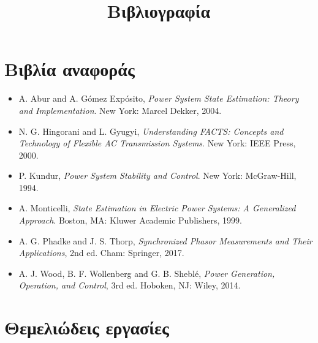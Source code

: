 \title{Βιβλιογραφία}

\section{Βιβλία αναφοράς}

\begin{itemize}
\item A. Abur and A. Gómez Expósito, \textit{Power System State Estimation: Theory and
      Implementation}. New York: Marcel Dekker, 2004.
\item N. G. Hingorani and L. Gyugyi, \textit{Understanding FACTS: Concepts and Technology of
      Flexible AC Transmission Systems}. New York: IEEE Press, 2000.
\item P. Kundur, \textit{Power System Stability and Control}. New York: McGraw-Hill, 1994.
\item A. Monticelli, \textit{State Estimation in Electric Power Systems: A Generalized
      Approach}. Boston, MA: Kluwer Academic Publishers, 1999.
\item A. G. Phadke and J. S. Thorp, \textit{Synchronized Phasor Measurements and Their
      Applications}, 2nd ed. Cham: Springer, 2017.
\item A. J. Wood, B. F. Wollenberg and G. B. Sheblé, \textit{Power Generation, Operation, and
      Control}, 3rd ed. Hoboken, NJ: Wiley, 2014.
\end{itemize}

\section{Θεμελιώδεις εργασίες}

